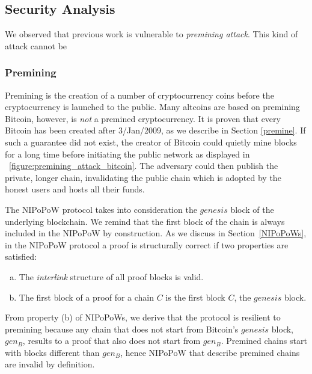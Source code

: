 \subsection{Security Analysis}

We observed that previous work is vulnerable to \emph{premining attack}. This
kind of attack cannot be

\subsubsection{Premining} Premining is the creation of a number of
cryptocurrency coins before the cryptocurrency is launched to the public. Many
altcoins are based on premining Bitcoin, however, is \emph{not} a premined
cryptocurrency. It is proven that every Bitcoin has been created after
3/Jan/2009, as we describe in Section \ref{premine}. If such a guarantee did
not exist, the creator of Bitcoin could quietly mine blocks for a long time
before initiating the public network as displayed in
~\ref{figure:premining_attack_bitcoin}. The adversary could then publish the
private, longer chain, invalidating the public chain which is adopted by the
honest users and hosts all their funds.



The NIPoPoW protocol takes into consideration the $genesis$ block of the
underlying blockchain. We remind that the first block of the chain is always
included in the NIPoPoW by construction. As we discuss in
Section~\ref{NIPoPoWs}, in the NIPoPoW protocol a proof is structurally correct
if two properties are satisfied:


\begin{enumerate}[(a)]

\item The \emph{interlink} structure of all proof blocks is valid.

\item The first block of a proof for a chain $C$ is the first block $C$, the
    $genesis$ block.

\end{enumerate}

From property (b) of NIPoPoWs, we derive that the protocol is resilient to
premining because any chain that does not start from Bitcoin's $genesis$ block,
$gen_{B}$, results to a proof that also does not start from $gen_{B}$. Premined
chains start with blocks different than $gen_{B}$, hence NIPoPoW that describe
premined chains are invalid by definition.

